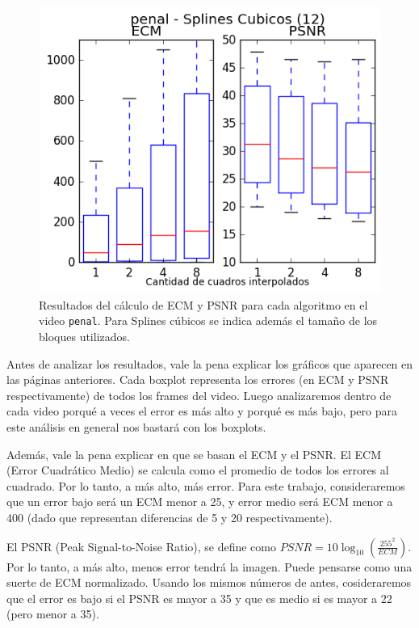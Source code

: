 \begin{figure}[H]
\begin{minipage}{0.33\textwidth}
    \includegraphics[width=1\textwidth]{imgs/resultados_error/penal_4.png} 
\end{minipage}
\caption{\footnotesize Resultados del cálculo de ECM y PSNR para cada algoritmo en el video \texttt{penal}. Para Splines cúbicos se indica además el tamaño de los bloques utilizados.}
\label{fig:errpenal}
\end{figure}

Antes de analizar los resultados, vale la pena explicar los gráficos que aparecen en las páginas anteriores. Cada boxplot representa los errores (en ECM y PSNR respectivamente) de todos los frames del video. Luego analizaremos dentro de cada video porqu\'e a veces el error es más alto y porqu\'e es más bajo, pero para este análisis en general nos bastará con los boxplots.

Además, vale la pena explicar en que se basan el ECM y el PSNR. El ECM (Error Cuadrático Medio) se calcula como el promedio de todos los errores al cuadrado. Por lo tanto, a más alto, más error. Para este trabajo, consideraremos que un error bajo será un ECM menor a 25, y error medio será ECM menor a 400 (dado que representan diferencias de 5 y 20 respectivamente).

El PSNR (Peak Signal-to-Noise Ratio), se define como $PSNR = 10 \log_{10}(\frac{255^2}{ECM})$. Por lo tanto, a más alto, menos error tendrá la imagen. Puede pensarse como una suerte de ECM normalizado. Usando los mismos números de antes, cosideraremos que el error es bajo si el PSNR es mayor a 35 y que es medio si es mayor a 22 (pero menor a 35).

